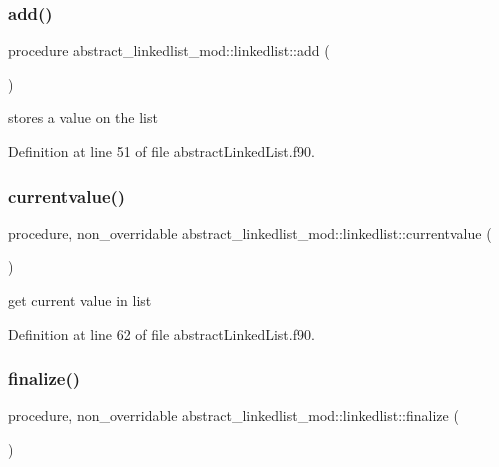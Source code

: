 \subsubsection{\texorpdfstring{add()}{add()}}
{\footnotesize\ttfamily procedure abstract\+\_\+linkedlist\+\_\+mod\+::linkedlist\+::add (\begin{DoxyParamCaption}{ }\end{DoxyParamCaption})\hspace{0.3cm}{\ttfamily [private]}}



stores a value on the list 



Definition at line 51 of file abstract\+Linked\+List.\+f90.

\mbox{\label{structabstract__linkedlist__mod_1_1linkedlist_a01dda56c3e79f6e9f5b12df9a9ec192b}} 
\subsubsection{\texorpdfstring{currentvalue()}{currentvalue()}}
{\footnotesize\ttfamily procedure, non\+\_\+overridable abstract\+\_\+linkedlist\+\_\+mod\+::linkedlist\+::currentvalue (\begin{DoxyParamCaption}{ }\end{DoxyParamCaption})\hspace{0.3cm}{\ttfamily [private]}}



get current value in list 



Definition at line 62 of file abstract\+Linked\+List.\+f90.

\mbox{\label{structabstract__linkedlist__mod_1_1linkedlist_af4fe24b10e4bdf057d3ed4a2fe2ff03c}} 
\subsubsection{\texorpdfstring{finalize()}{finalize()}}
{\footnotesize\ttfamily procedure, non\+\_\+overridable abstract\+\_\+linkedlist\+\_\+mod\+::linkedlist\+::finalize (\begin{DoxyParamCaption}{ }\end{DoxyParamCaption})\hspace{0.3cm}{\ttfamily [private]}}



